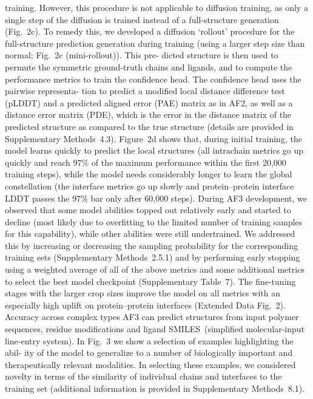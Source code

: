 training. However, this procedure is not applicable to diffusion training,
as only a single step of the diffusion is trained instead of a full-structure
generation (Fig. 2c). To remedy this, we developed a diffusion ‘rollout’
procedure for the full-structure prediction generation during training
(using a larger step size than normal; Fig. 2c (mini-rollout)). This pre-
dicted structure is then used to permute the symmetric ground-truth
chains and ligands, and to compute the performance metrics to train
the confidence head. The confidence head uses the pairwise representa-
tion to predict a modified local distance difference test (pLDDT) and a
predicted aligned error (PAE) matrix as in AF2, as well as a distance error
matrix (PDE), which is the error in the distance matrix of the predicted
structure as compared to the true structure (details are provided in
Supplementary Methods 4.3).
Figure 2d shows that, during initial training, the model learns quickly
to predict the local structures (all intrachain metrics go up quickly and
reach 97\% of the maximum performance within the first 20,000 training
steps), while the model needs considerably longer to learn the global
constellation (the interface metrics go up slowly and protein–protein
interface LDDT passes the 97\% bar only after 60,000 steps). During
AF3 development, we observed that some model abilities topped out
relatively early and started to decline (most likely due to overfitting to
the limited number of training samples for this capability), while other
abilities were still undertrained. We addressed this by increasing or
decreasing the sampling probability for the corresponding training
sets (Supplementary Methods 2.5.1) and by performing early stopping
using a weighted average of all of the above metrics and some additional
metrics to select the best model checkpoint (Supplementary Table 7).
The fine-tuning stages with the larger crop sizes improve the model on
all metrics with an especially high uplift on protein–protein interfaces
(Extended Data Fig. 2).
Accuracy across complex types
AF3 can predict structures from input polymer sequences, residue
modifications and ligand SMILES (simplified molecular-input line-entry
system). In Fig. 3 we show a selection of examples highlighting the abil-
ity of the model to generalize to a number of biologically important
and therapeutically relevant modalities. In selecting these examples,
we considered novelty in terms of the similarity of individual chains
and interfaces to the training set (additional information is provided
in Supplementary Methods 8.1).
